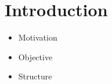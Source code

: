 \chapter{Introduction}
\begin{itemize}
    \item Motivation
    \item Objective
    \item Structure
\end{itemize}
